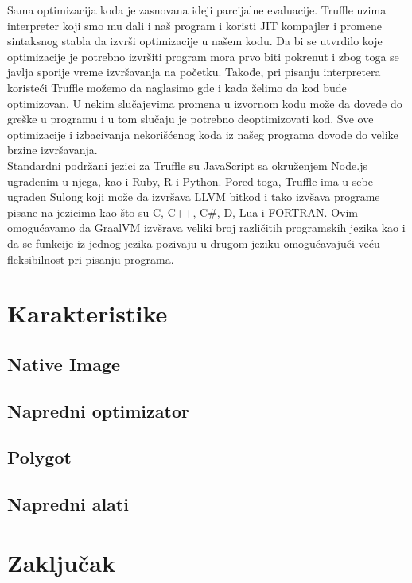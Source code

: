 \documentclass[a4paper]{article}
\begin{document}
Sama optimizacija koda je zasnovana ideji parcijalne evaluacije. Truffle uzima interpreter koji smo mu dali i naš program i koristi JIT kompajler i promene sintaksnog stabla da izvrši optimizacije u našem kodu. Da bi se utvrdilo koje optimizacije je potrebno izvršiti program mora prvo biti pokrenut i zbog toga se javlja sporije vreme izvršavanja na početku. Takođe, pri pisanju interpretera koristeći Truffle možemo da naglasimo gde i kada želimo da kod bude optimizovan. U nekim slučajevima promena u izvornom kodu može da dovede do greške u programu i u tom slučaju je potrebno deoptimizovati kod. Sve ove optimizacije i izbacivanja nekorišćenog koda iz našeg programa dovode do velike brzine izvršavanja. \\

Standardni podržani jezici za Truffle su JavaScript sa okruženjem Node.js ugrađenim u njega, kao i Ruby, R i Python. Pored toga, Truffle ima u sebe ugrađen Sulong koji može da izvršava LLVM bitkod i tako izvšava programe pisane na jezicima kao što su C, C++, C\#, D, Lua i FORTRAN. Ovim omogućavamo da GraalVM izvšrava veliki broj različitih programskih jezika kao i da se funkcije iz jednog jezika pozivaju u drugom jeziku omogućavajući veću fleksibilnost pri pisanju programa.

\section{Karakteristike}
\label{sec:Karakteristike}

\subsection{Native Image}
\label{sub:Native Image}

\subsection{Napredni optimizator}
\label{sub:Napredni optimizator}

\subsection{Polygot}
\label{sub:Polygot}


\subsection{Napredni alati}
\label{sub:Napredni alati}

\section{Zaključak}
\label{sec:zakljucak}
\end{document}

